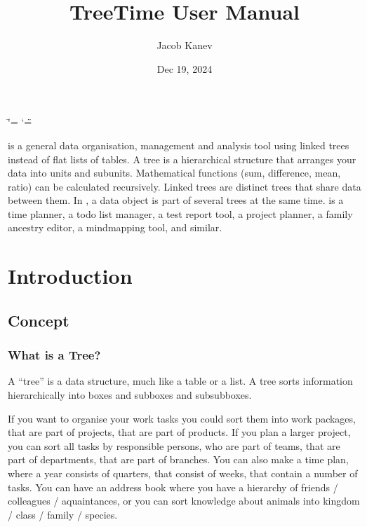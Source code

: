 \documentclass[letterpaper,10pt,english]{sphinxmanual}
\title{TreeTime User Manual}
\date{Dec 19, 2024}
\author{Jacob Kanev}
\begin{document}
\ifdefined\shorthandoff
  \ifnum\catcode`\=\string=\active\shorthandoff{=}\fi
  \ifnum\catcode`\"=\active{}\fi
\fi

\pagestyle{empty}
\sphinxmaketitle
\pagestyle{plain}
\sphinxtableofcontents
\pagestyle{normal}
\label{\detokenize{index::doc}}

\sphinxAtStartPar
{} is a general data organisation, management and analysis tool using linked trees instead of flat lists of tables.
A tree is a hierarchical structure that arranges your data into units and sub\sphinxhyphen{}units.
Mathematical functions (sum, difference, mean, ratio) can be calculated recursively.
Linked trees are distinct trees that share data between them.
In , a data object is part of several trees at the same time.
 is a time planner, a to\sphinxhyphen{}do list manager, a test report tool, a project planner, a family ancestry editor, a mind\sphinxhyphen{}mapping tool, and similar.



\sphinxstepscope


\chapter{Introduction}
\label{\detokenize{introduction:introduction}}\label{\detokenize{introduction::doc}}

\section{Concept}
\label{\detokenize{introduction:concept}}

\subsection{What is a Tree?}
\label{\detokenize{introduction:what-is-a-tree}}
\sphinxAtStartPar
A “tree” is a data structure, much like a table or a list.
A tree sorts information hierarchically into boxes and sub\sphinxhyphen{}boxes and sub\sphinxhyphen{}sub\sphinxhyphen{}boxes.

\sphinxAtStartPar
If you want to organise your work tasks you could sort them into work packages, that are part of projects, that are part of products.
If you plan a larger project, you can sort all tasks by responsible persons, who are part of teams, that are part of departments, that are part of branches.
You can also make a time plan, where a year consists of quarters, that consist of weeks, that contain a number of tasks.
You can have an address book where you have a hierarchy of friends / colleagues / aquaintances, or you can sort knowledge about animals into kingdom / class / family / species.
\end{document}
